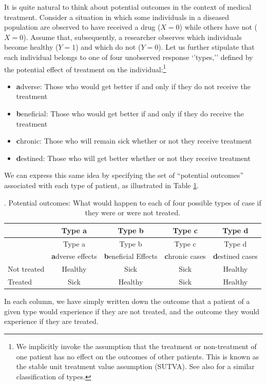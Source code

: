 \documentclass[12pt,]{book}
\providecommand{\tightlist}{%
  \setlength{\itemsep}{0pt}\setlength{\parskip}{0pt}}
\let\rmarkdownfootnote\footnote%
\def\footnote{\protect\rmarkdownfootnote}
\begin{document}
It is quite natural to think about potential outcomes in the context of medical treatment. Consider a situation in which some individuals in a diseased population are observed to have received a drug (\(X=0\)) while others have not (\(X=0\)). Assume that, subsequently, a researcher observes which individuals become healthy (\(Y=1\)) and which do not (\(Y=0\)). Let us further stipulate that each individual belongs to one of four unobserved response `'types,'' defined by the potential effect of treatment on the individual:\footnote{We implicitly invoke the assumption that the treatment or non-treatment of one patient has no effect on the outcomes of other patients. This is known as the stable unit treatment value assumption (SUTVA). See also \citet{HerronQuinn} for a similar classification of types.}

\begin{itemize}
\tightlist
\item
  \textbf{a}dverse: Those who would get better if and only if they do not receive the treatment
\item
  \textbf{b}eneficial: Those who would get better if and only if they do receive the treatment
\item
  \textbf{c}hronic: Those who will remain sick whether or not they receive treatment
\item
  \textbf{d}estined: Those who will get better whether or not they receive treatment
\end{itemize}

We can express this same idea by specifying the set of ``potential outcomes'' associated with each type of patient, as illustrated in Table \ref{tab:PO}.

\begin{longtable}[]{@{}lcccc@{}}
\caption{\label{tab:PO}. Potential outcomes: What would happen to each of four possible types of case if they were or were not treated.}\tabularnewline
\toprule
\small & Type a & Type b & Type c & Type d\tabularnewline
\midrule
\endfirsthead
\toprule
\small & Type a & Type b & Type c & Type d\tabularnewline
\midrule
\endhead
& \textbf{a}dverse effects & \textbf{b}eneficial Effects & \textbf{c}hronic cases & \textbf{d}estined cases\tabularnewline
Not treated & Healthy & Sick & Sick & Healthy\tabularnewline
Treated & Sick & Healthy & Sick & Healthy\tabularnewline
\bottomrule
\end{longtable}

In each column, we have simply written down the outcome that a patient of a given type would experience if they are not treated, and the outcome they would experience if they are treated.
\end{document}
